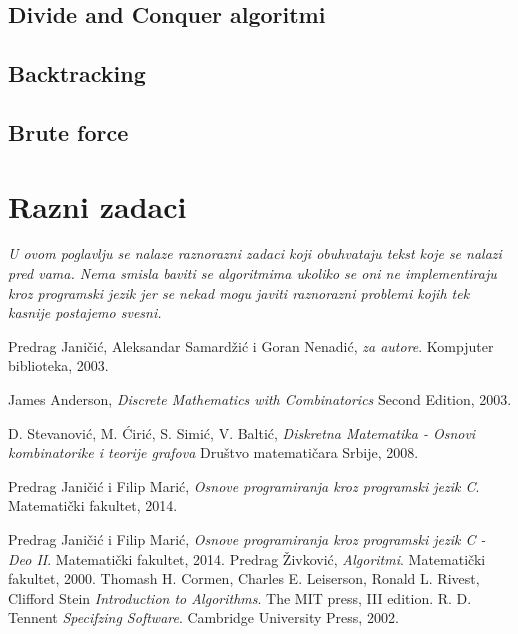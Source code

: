 \documentclass{memoir}
\begin{document}
\section{Divide and Conquer algoritmi}

\section{Backtracking}

\section{Brute force}

\chapter{Razni zadaci}
\emph{U ovom poglavlju se nalaze raznorazni zadaci koji obuhvataju tekst koje se nalazi pred vama. Nema smisla baviti 
se algoritmima ukoliko se oni ne implementiraju kroz programski jezik jer se nekad mogu javiti raznorazni problemi 
kojih tek kasnije postajemo svesni.}
\newpage

\begin{thebibliography}{9}
  Predrag Janičić, Aleksandar Samardžić i Goran Nenadić,
  \emph{\LaTeXe za autore}.
  Kompjuter biblioteka,
  2003.

  James Anderson,
  \emph{Discrete Mathematics with Combinatorics}
  Second Edition, 
  2003.

  D. Stevanović, M. Ćirić, S. Simić, V. Baltić,
  \emph{Diskretna Matematika - Osnovi kombinatorike i teorije grafova}
  Društvo matematičara Srbije,
  2008.

  Predrag Janičić i Filip Marić,
  \emph{Osnove programiranja kroz programski jezik C}.
  Matematički fakultet,
  2014.

  Predrag Janičić i Filip Marić,
  \emph{Osnove programiranja kroz programski jezik C - Deo II}.
  Matematički fakultet,
  2014.
  Predrag Živković,
  \emph{Algoritmi}.
  Matematički fakultet,
  2000.
  Thomash H. Cormen, Charles E. Leiserson, Ronald L. Rivest, Clifford Stein
  \emph{Introduction to Algorithms}.
  The MIT press, III edition.
  R. D. Tennent 
  \emph{Specifzing Software}.
  Cambridge University Press, 2002. 
\end{thebibliography}
\end{document}
